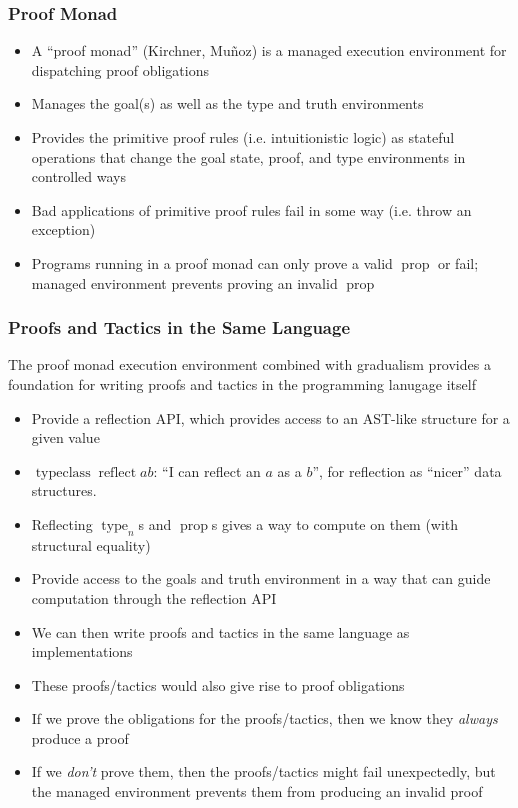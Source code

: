 \documentclass{beamer}
\newcommand{\typekw}[1]{\ensuremath{{\operatorname{type}}_{#1}}}
\newcommand{\propkw}{\ensuremath{\operatorname{prop}}}
\begin{document}
\begin{frame}
  \frametitle{Proof Monad}
  \begin{itemize}
    \item A ``proof monad'' (Kirchner, Mu\~{n}oz) is a managed
      execution environment for dispatching proof obligations
    \item Manages the goal(s) as well as the type and truth
      environments
    \item Provides the primitive proof rules (i.e. intuitionistic
      logic) as stateful operations that change the goal state, proof,
      and type environments in controlled ways
    \item Bad applications of primitive proof rules fail in some way
      (i.e. throw an exception)
    \item Programs running in a proof monad can only prove a valid
      \propkw{} or fail; managed environment prevents proving an
      invalid \propkw{}
  \end{itemize}
\end{frame}

\begin{frame}
  \frametitle{Proofs and Tactics in the Same Language}

  The proof monad execution environment combined with gradualism
  provides a foundation for writing proofs and tactics in the
  programming lanugage itself
  \begin{itemize}
    \item Provide a reflection API, which provides access to an
      AST-like structure for a given value
    \item $\operatorname{typeclass} \operatorname{reflect} a b$: ``I can
      reflect an $a$ as a $b$'', for reflection as ``nicer'' data
      structures.
    \item Reflecting \typekw{n}s and \propkw{}s gives a way to compute
      on them (with structural equality)
    \item Provide access to the goals and truth environment in a way
      that can guide computation through the reflection API
    \item We can then write proofs and tactics in the same language as
      implementations
    \item These proofs/tactics would also give rise to proof
      obligations
    \item If we prove the obligations for the proofs/tactics, then we
      know they \emph{always} produce a proof
    \item If we \emph{don't} prove them, then the proofs/tactics might
      fail unexpectedly, but the managed environment prevents them
      from producing an invalid proof
  \end{itemize}
\end{frame}
\end{document}
